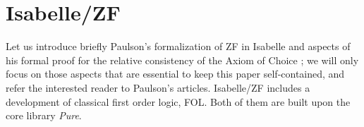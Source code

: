 \section{Isabelle/ZF}

Let us introduce briefly Paulson's formalization of ZF
\cite{paulson2017isabelle} in Isabelle and aspects of his formal proof
for the relative consistency of the Axiom of Choice
\cite{paulson_2003}; we will only focus on those aspects that are
essential to keep this paper self-contained, and refer the interested
reader to Paulson's articles. 
Isabelle/ZF includes a development of classical first order logic,
FOL. Both of them are  built upon the core library \emph{Pure}. 

